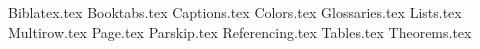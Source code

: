 {Biblatex.tex}
{Booktabs.tex}
{Captions.tex}
{Colors.tex}
{Glossaries.tex}
{Lists.tex}
{Multirow.tex}
{Page.tex}
{Parskip.tex}
{Referencing.tex}
{Tables.tex}
{Theorems.tex}
\usepackage[english]{babel}
\usepackage{amsmath}
\usepackage{amssymb}
\usepackage{csquotes}
\usepackage{expl3}
\usepackage{fontspec}
\usepackage{graphicx}
\usepackage{keyval}
\usepackage{url}
\usepackage{xparse}
\usepackage{blindtext}
\usepackage{datetime2}
\usepackage{float}
\usepackage{algorithm}
\usepackage{algpseudocode}
\usepackage{kbordermatrix}
